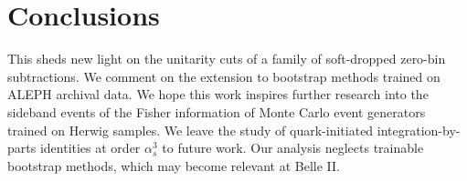 \section{Conclusions}\label{sec:conclusions}

This sheds new light on the unitarity cuts of a family of soft-dropped
zero-bin subtractions. We comment on the extension to bootstrap methods
trained on ALEPH archival data. We hope this work inspires further
research into the sideband events of the Fisher information of Monte
Carlo event generators trained on Herwig samples. We leave the study of
quark-initiated integration-by-parts identities at order $\alpha_s^3$ to
future work. Our analysis neglects trainable bootstrap methods, which
may become relevant at Belle II.

